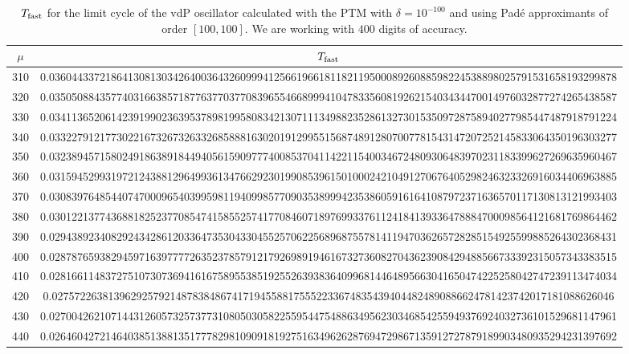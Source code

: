 \documentclass[final]{article}
\begin{document}
\begin{table}
\caption{$T_{\rm fast}$  for the limit cycle of the vdP oscillator calculated with the PTM with $\delta=10^{-100}$ and using Pad\'e approximants of order $[100,100]$. We are working with $400$ digits of accuracy. }
\bigskip
\label{table_tfast_vdP3}
\begin{center}
\begin{tabular}{|c|c|}
\hline
$\mu$ &   $T_{\rm fast}$    \\
\hline
310 &   0.03604433721864130813034264003643260999412566196618118211950008926088598224538898025791531658193299878 \\
320 &   0.03505088435774031663857187763770377083965546689994104783356081926215403434470014976032877274265438587 \\
330 &   0.03411365206142391990236395378981995808342130711134988235286132730153509728758940277985447487918791224 \\
340 &   0.03322791217730221673267326332685888163020191299551568748912807007781543147207252145833064350196303277 \\
350 &   0.03238945715802491863891844940561590977740085370411422115400346724809306483970231183399627269635960467 \\
360 &   0.03159452993197212438812964993613476629230199085396150100024210491270676405298246323326916034406963885 \\
370 &   0.03083976485440747000965403995981194099857709035389994235386059161641087972371636570117130813121993403 \\
380 &   0.03012213774368818252377085474158552574177084607189769933761124184139336478884700098564121681769864462 \\
390 &   0.02943892340829243428612033647353043304552570622568968755781411947036265728285154925599885264302368431 \\
400 &   0.02878765938294597163977772635237857912179269891946167327360827043623908429488566733392315057343383515 \\
410 &   0.02816611483727510730736941616758955385192552639383640996814464895663041650474225258042747239113474034 \\
420 &   0.0275722638139629257921487838486741719455881755522336748354394044824890886624781423742017181088626046  \\
430 &   0.02700426210714431260573257377310805030582255954475488634956230346854255949376924032736101529681147961 \\
440 &   0.02646042721464038513881351777829810909181927516349626287694729867135912727879189903480935294231397692 \\

\end{tabular}
\end{center}
\end{table}
\end{document}
